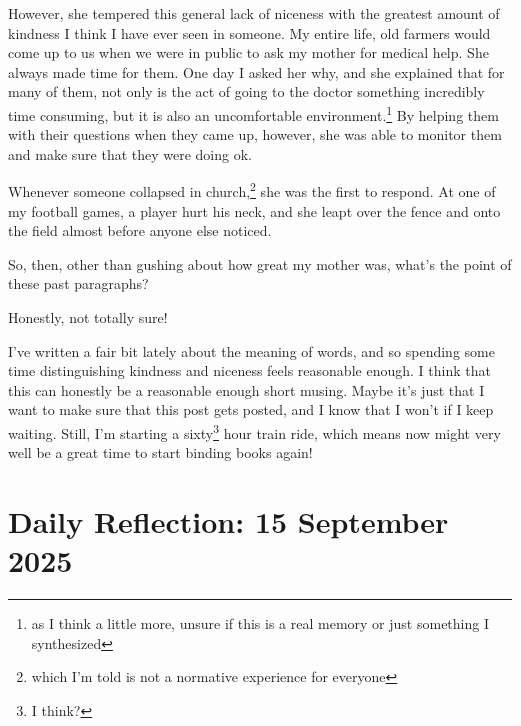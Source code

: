 \documentclass[12pt]{article}
\renewcommand{\,}{\textsuperscript{,}}
\begin{document}
However, she tempered this general lack of niceness with the greatest amount of kindness I think I have ever seen in someone.
My entire life, old farmers would come up to us when we were in public to ask my mother for medical help.
She always made time for them.
One day I asked her why, and she explained that for many of them, not only is the act of going to the doctor something incredibly time consuming, but it is also an uncomfortable environment.\footnote{as I think a little more, unsure if this is a real memory or just something I synthesized}
By helping them with their questions when they came up, however, she was able to monitor them and make sure that they were doing ok.

Whenever someone collapsed in church,\footnote{which I'm told is not a normative experience for everyone} she was the first to respond.
At one of my football games, a player hurt his neck, and she leapt over the fence and onto the field almost before anyone else noticed.

So, then, other than gushing about how great my mother was, what's the point of these past paragraphs?

Honestly, not totally sure!

I've written a fair bit lately about the meaning of words, and so spending some time distinguishing kindness and niceness feels reasonable enough.
I think that this can honestly be a reasonable enough short musing.
Maybe it's just that I want to make sure that this post gets posted, and I know that I won't if I keep waiting.
Still, I'm starting a sixty\footnote{I think?} hour train ride, which means now might very well be a great time to start binding books again!

\section{Daily Reflection: 15 September 2025}
\end{document}
